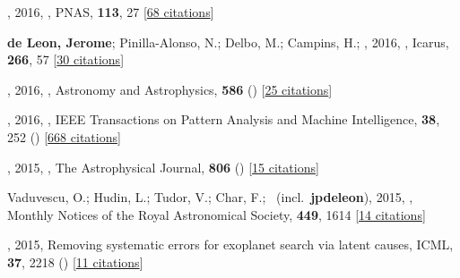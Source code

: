 \item[{\color{numcolor}\scriptsize66}] , 2016, , PNAS, \textbf{113}, 27 [\href{https://scholar.google.com/scholar?cites=2429561747341807338}{68 citations}]

\item[{\color{numcolor}\scriptsize65}] \textbf{de Leon, Jerome}; Pinilla-Alonso, N.; Delbo, M.; Campins, H.; \etal, 2016, , Icarus, \textbf{266}, 57 [\href{https://ui.adsabs.harvard.edu/abs/2016Icar..266...57D}{30 citations}]

\item[{\color{numcolor}\scriptsize64}] , 2016, , Astronomy and Astrophysics, \textbf{586} () [\href{https://ui.adsabs.harvard.edu/abs/2016A&A...586A.129M}{25 citations}]

\item[{\color{numcolor}\scriptsize63}] , 2016, , IEEE Transactions on Pattern Analysis and Machine Intelligence, \textbf{38}, 252 () [\href{https://scholar.google.com/scholar?cites=7122560326210979193,5194420368165307096,3347404430934682534}{668 citations}]

\item[{\color{numcolor}\scriptsize62}] , 2015, , The Astrophysical Journal, \textbf{806} () [\href{https://ui.adsabs.harvard.edu/abs/2015ApJ...806L..10D}{15 citations}]

\item[{\color{numcolor}\scriptsize61}] Vaduvescu, O.; Hudin, L.; Tudor, V.; Char, F.; \etal\ (incl.\ \textbf{jpdeleon}), 2015, , Monthly Notices of the Royal Astronomical Society, \textbf{449}, 1614 [\href{https://ui.adsabs.harvard.edu/abs/2015MNRAS.449.1614V}{14 citations}]

\item[{\color{numcolor}\scriptsize60}] , 2015, Removing systematic errors for exoplanet search via latent causes, ICML, \textbf{37}, 2218 () [\href{https://scholar.google.com/scholar?cites=11768165421845046384}{11 citations}]

